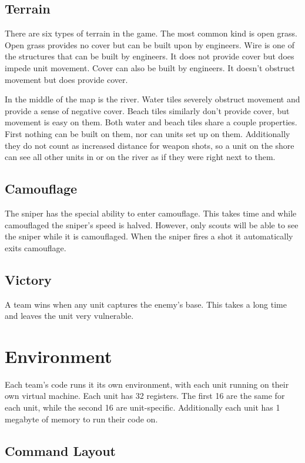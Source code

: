 \documentclass{article}
\begin{document}
\subsection{Terrain}

There are six types of terrain in the game. The most common kind is open grass.
Open grass provides no cover but can be built upon by engineers. Wire is one of
the structures that can be built by engineers. It does not provide cover but
does impede unit movement. Cover can also be built by engineers. It doesn't
obstruct movement but does provide cover.

In the middle of the map is the river. Water tiles severely obstruct movement
and provide a sense of negative cover. Beach tiles similarly don't provide
cover, but movement is easy on them. Both water and beach tiles share a couple
properties. First nothing can be built on them, nor can units set up on them.
Additionally they do not count as increased distance for weapon shots, so a unit
on the shore can see all other units in or on the river as if they were right
next to them.

\subsection{Camouflage}

The sniper has the special ability to enter camouflage. This takes time and
while camouflaged the sniper's speed is halved. However, only scouts will be
able to see the sniper while it is camouflaged. When the sniper fires a shot it
automatically exits camouflage.

\subsection{Victory}

A team wins when any unit captures the enemy's base. This takes a long time and
leaves the unit very vulnerable.

\section{Environment}

Each team's code runs it its own environment, with each unit running on their
own virtual machine. Each unit has 32 registers. The first 16 are the same for
each unit, while the second 16 are unit-specific. Additionally each unit has 1
megabyte of memory to run their code on.

\subsection{Command Layout}
\end{document}
